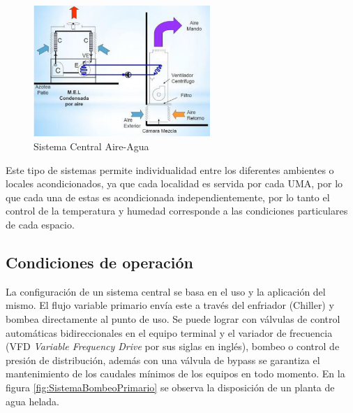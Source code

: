 \begin{itemize}
   \begin{figure}[H]
    \centering
    \includegraphics[width=0.60\textwidth]{2_MainMatter/Capitulo2/Imagenes/SistemaAguaAire.PNG}
    \caption{Sistema Central Aire-Agua \cite{Sistemadividido}}
    \label{fig:ejemploAire-Agua}
\end{figure}

\end{itemize}

Este tipo de sistemas permite individualidad entre los diferentes ambientes o locales acondicionados, ya que cada localidad es servida por cada UMA, por lo que cada una de estas es acondicionada independientemente, por lo tanto el control de la temperatura y humedad corresponde a las condiciones particulares de cada espacio.

\subsection{Condiciones de operación}
La configuración de un sistema central se basa en el uso y la aplicación del mismo. El flujo variable primario envía este a través del enfriador (Chiller) y bombea directamente al punto de uso. Se puede lograr con válvulas de control automáticas bidireccionales en el equipo terminal y el variador de frecuencia (VFD \textit{Variable Frequency Drive} por sus siglas en inglés), bombeo o control de presión de distribución, además con una válvula de bypass se garantiza el mantenimiento de los caudales mínimos de los equipos en todo momento. En la figura \ref{fig:SistemaBombeoPrimario} se observa la disposición de un planta de agua helada.

